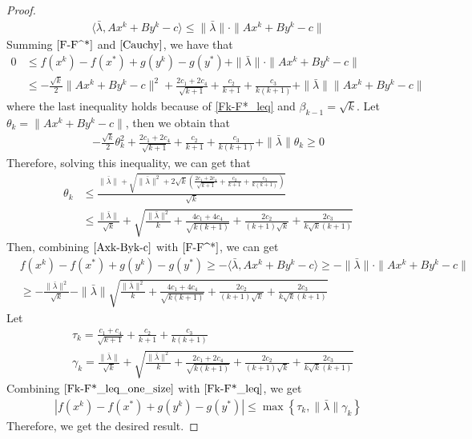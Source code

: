 \documentclass{article}
\numberwithin{equation}{section}
\begin{document}
\begin{proof}
\begin{align}
        \langle \bar{\lambda}, Ax^k+By^k-c\rangle \leq \|\bar{\lambda}\rVert \cdot\|Ax^k+By^k-c\rVert \label{Cauchy}
    \end{align}
    Summing $\eqref{F-F^*}$ and $\eqref{Cauchy}$, we have that 
    \begin{align}
        0&\leq f(x^k) -f(x^*) + g(y^k) -g(y^*) + \|\bar{\lambda}\rVert \cdot \|Ax^k+By^k-c\rVert \nonumber \\
        & \leq -\frac{\sqrt{k}}{2}\|Ax^k+By^k-c\|^2 +  \frac{2c_1+2c_4}{\sqrt{k+1}} +\frac{c_2}{k+1}+ \frac{c_3}{k(k+1)} +\|\bar{\lambda}\rVert\|Ax^k+By^k-c\|
    \end{align}
    where the last inequality holds because of \eqref{Fk-F*_leq} and $\beta_{k-1} =\sqrt{k}$. 
    Let $\theta_k = \|Ax^k+By^k-c\rVert$, then we obtain that 
    \begin{align}
        -\frac{\sqrt{k}}{2}\theta_k^2 +  \frac{2c_1+2c_4}{\sqrt{k+1}} +\frac{c_2}{k+1}+ \frac{c_3}{k(k+1)} 
        +\|\bar{\lambda}\rVert \theta_k\geq 0
    \end{align}
    Therefore, solving this inequality, we can get that 
    \begin{align}
        \theta_k &\leq \frac{\|\bar{\lambda}\rVert+ \sqrt{\|\bar{\lambda}\rVert^2+2\sqrt{k}\left(\frac{2c_1+2c_4}{\sqrt{k+1}} +\frac{c_2}{k+1}+ \frac{c_3}{k(k+1)} \right)}}{\sqrt{k}} \nonumber \\
        & \leq \frac{\|\bar{\lambda}\rVert}{\sqrt{k}}+\sqrt{\frac{\|\bar{\lambda}\rVert^2}{k}+\frac{4c_1+4c_4}{\sqrt{k(k+1)}} +\frac{2c_2}{(k+1)\sqrt{k}}+ \frac{2c_3}{k\sqrt{k}(k+1)}} \label{Axk-Byk-c}
    \end{align}
    Then, combining $\eqref{Axk-Byk-c}$ with $\eqref{F-F^*}$, we can get 
    \begin{align}
        &f(x^k) -f(x^*) + g(y^k) -g(y^*) \geq -\langle \bar{\lambda}, Ax^k+By^k-c \rangle \geq -\| \bar{\lambda} \rVert \cdot \|Ax^k+ By^k-c\rVert \nonumber \\
        & \geq -\frac{\|\bar{\lambda}\rVert^2}{\sqrt{k}}-\|\bar{\lambda}\rVert\sqrt{\frac{\|\bar{\lambda}\rVert^2}{k}+\frac{4c_1+4c_4}{\sqrt{k(k+1)}} +\frac{2c_2}{(k+1)\sqrt{k}}+ \frac{2c_3}{k\sqrt{k}(k+1)}}
        &\label{Fk-F*}
    \end{align}
    Let
    \begin{align}
        &\tau_k=\frac{c_1 + c_4}{\sqrt{k+1}} +\frac{c_2}{k+1}+ \frac{c_3}{k(k+1)} \nonumber \\
        &\gamma_k = \frac{\|\bar{\lambda}\rVert}{\sqrt{k}}+\sqrt{\frac{\|\bar{\lambda}\rVert^2}{k}+
        \frac{2c_1+ 2c_4}{\sqrt{k(k+1)}} +\frac{2c_2}{(k+1)\sqrt{k}}+ \frac{2c_3}{k\sqrt{k}(k+1)}} \nonumber 
    \end{align}
    Combining $\eqref{Fk-F*_leq_one_size}$ with $\eqref{Fk-F*_leq}$, we get
    \begin{align}
        |f(x^k) -f(x^*) + g(y^k) -g(y^*)| \leq \max\left\{ \tau_k,\|\bar{\lambda}\rVert \gamma_k \right\}
    \end{align}
    Therefore, we get the desired result.
\end{proof}
\end{document}
